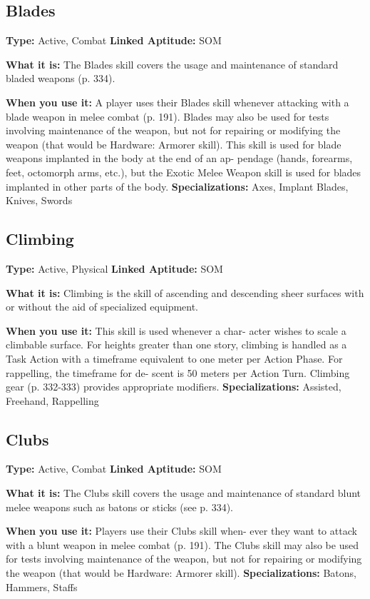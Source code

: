 \subsection{Blades}

\textbf{Type:} Active, Combat
\textbf{Linked Aptitude:} SOM

\textbf{What it is:} The Blades skill covers the usage and 
maintenance of standard bladed weapons (p. 334).

\textbf{When you use it:} A player uses their Blades skill 
whenever attacking with a blade weapon in melee 
combat (p. 191). Blades may also be used for tests 
involving maintenance of the weapon, but not for 
repairing or modifying the weapon (that would be 
Hardware: Armorer skill). This skill is used for blade 
weapons implanted in the body at the end of an ap-
pendage (hands, forearms, feet, octomorph arms, etc.), 
but the Exotic Melee Weapon skill is used for blades 
implanted in other parts of the body.
\textbf{Specializations:} Axes, Implant Blades, Knives, Swords

\subsection{Climbing}

\textbf{Type:} Active, Physical
\textbf{Linked Aptitude:} SOM

\textbf{What it is:} Climbing is the skill of ascending and 
descending sheer surfaces with or without the aid of 
specialized equipment.

\textbf{When you use it:} This skill is used whenever a char-
acter wishes to scale a climbable surface. For heights 
greater than one story, climbing is handled as a Task 
Action with a timeframe equivalent to one meter per 
Action Phase. For rappelling, the timeframe for de-
scent is 50 meters per Action Turn. Climbing gear (p. 
332-333) provides appropriate modifiers.
\textbf{Specializations:} Assisted, Freehand, Rappelling

\subsection{Clubs}

\textbf{Type:} Active, Combat
\textbf{Linked Aptitude:} SOM

\textbf{What it is:} The Clubs skill covers the usage and 
maintenance of standard blunt melee weapons such 
as batons or sticks (see p. 334).

\textbf{When you use it:} Players use their Clubs skill when-
ever they want to attack with a blunt weapon in melee 
combat (p. 191). The Clubs skill may also be used for 
tests involving maintenance of the weapon, but not 
for repairing or modifying the weapon (that would be 
Hardware: Armorer skill).
\textbf{Specializations:} Batons, Hammers, Staffs

